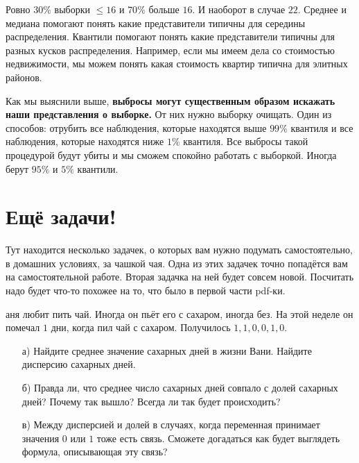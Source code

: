 \documentclass[12pt, a4paper, oneside]{article}
\theoremstyle{plain} %
\theoremstyle{definition}
\newcounter{problem}%
\renewcommand{\theproblem}{\arabic{problem}}
\newenvironment{problem}[1]{
\addtocounter{problem}{1}\noindent{ \color{titleblue} \large \bfseries Упражнение~\theproblem~#1 \vspace{1ex} \newline}
}{ }
\newcommand{\indef}[1]{\textbf{ \color{green} #1}}
\begin{document}
\begin{solution}
\begin{enumerate}
	Ровно $30\%$ выборки $ \le 16$ и $70\%$ больше $16$. И наоборот в случае $22$. Среднее и медиана помогают понять какие представители типичны для середины распределения. Квантили помогают понять какие представители типичны для разных кусков распределения. Например, если мы имеем дела со стоимостью недвижимости, мы можем понять какая стоимость квартир типична для элитных районов. 

	Как мы выяснили выше, \indef{выбросы могут существенным образом искажать наши представления о выборке.} От них нужно выборку очищать. Один из способов: отрубить все наблюдения, которые находятся выше $99\%$ квантиля и все наблюдения, которые находятся ниже $1\%$ квантиля. Все выбросы такой процедурой будут убиты и мы сможем спокойно работать с выборкой. Иногда берут $95\%$ и $5\%$ квантили. 
\end{enumerate}
\end{solution}



\section*{Ещё задачи!} 

Тут находится несколько задачек, о которых вам нужно подумать самостоятельно, в домашних условиях, за чашкой чая. Одна из этих задачек точно попадётся вам на самостоятельной работе. Вторая задачка на ней будет совсем новой. Посчитать надо будет что-то похожее на то, что было в первой части pdf-ки.

\begin{problem} 
Ваня любит пить чай. Иногда он пьёт его с сахаром, иногда без. На этой неделе он помечал $1$ дни, когда пил чай с сахаром. Получилось $1,1,0,0,1,0$.  

\begin{enumerate}
    \item[а)] Найдите среднее значение сахарных дней в жизни Вани. Найдите дисперсию сахарных дней.
    \item[б)] Правда ли, что среднее число сахарных дней совпало с долей сахарных дней? Почему так вышло? Всегда ли так будет происходить?
    \item[в)] Между дисперсией и долей в случаях, когда переменная принимает значения $0$ или $1$ тоже есть связь. Сможете догадаться как будет выглядеть формула, описывающая эту связь? 
\end{enumerate}
\end{problem} 
\end{document}
